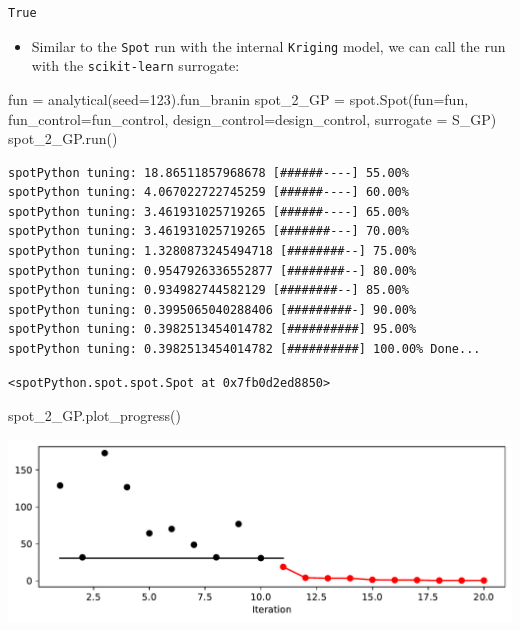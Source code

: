 \documentclass[
  letterpaper,
  DIV=11,
  numbers=noendperiod]{scrreprt}
\newenvironment{Shaded}{\begin{snugshade}}{\end{snugshade}}
\newcommand{\DecValTok}[1]{\textcolor[rgb]{0.68,0.00,0.00}{#1}}
\newcommand{\NormalTok}[1]{\textcolor[rgb]{0.00,0.23,0.31}{#1}}
\newcommand{\OperatorTok}[1]{\textcolor[rgb]{0.37,0.37,0.37}{#1}}
\providecommand{\tightlist}{%
  \setlength{\itemsep}{0pt}\setlength{\parskip}{0pt}}\usepackage{longtable,booktabs,array}
\begin{document}
\begin{verbatim}
True
\end{verbatim}

\begin{itemize}
\tightlist
\item
  Similar to the \texttt{Spot} run with the internal \texttt{Kriging}
  model, we can call the run with the \texttt{scikit-learn} surrogate:
\end{itemize}

\begin{Shaded}
\begin{Highlighting}[]
\NormalTok{fun }\OperatorTok{=}\NormalTok{ analytical(seed}\OperatorTok{=}\DecValTok{123}\NormalTok{).fun\_branin}
\NormalTok{spot\_2\_GP }\OperatorTok{=}\NormalTok{ spot.Spot(fun}\OperatorTok{=}\NormalTok{fun,}
\NormalTok{                     fun\_control}\OperatorTok{=}\NormalTok{fun\_control,}
\NormalTok{                     design\_control}\OperatorTok{=}\NormalTok{design\_control,}
\NormalTok{                     surrogate }\OperatorTok{=}\NormalTok{ S\_GP)}
\NormalTok{spot\_2\_GP.run()}
\end{Highlighting}
\end{Shaded}

\begin{verbatim}
spotPython tuning: 18.86511857968678 [######----] 55.00% 
spotPython tuning: 4.067022722745259 [######----] 60.00% 
spotPython tuning: 3.461931025719265 [######----] 65.00% 
spotPython tuning: 3.461931025719265 [#######---] 70.00% 
spotPython tuning: 1.3280873245494718 [########--] 75.00% 
spotPython tuning: 0.9547926336552877 [########--] 80.00% 
spotPython tuning: 0.934982744582129 [########--] 85.00% 
spotPython tuning: 0.3995065040288406 [#########-] 90.00% 
spotPython tuning: 0.3982513454014782 [##########] 95.00% 
spotPython tuning: 0.3982513454014782 [##########] 100.00% Done...
\end{verbatim}

\begin{verbatim}
<spotPython.spot.spot.Spot at 0x7fb0d2ed8850>
\end{verbatim}

\begin{Shaded}
\begin{Highlighting}[]
\NormalTok{spot\_2\_GP.plot\_progress()}
\end{Highlighting}
\end{Shaded}

\includegraphics{010_num_spot_sklearn_surrogate_files/figure-pdf/cell-17-output-1.pdf}
\end{document}
